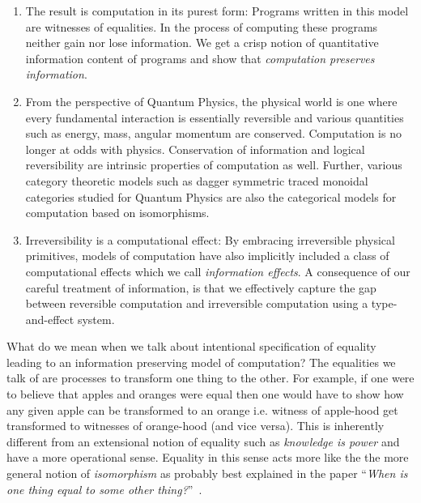 \documentclass{article}
\begin{document}
\begin{enumerate}

\item The result is computation in its purest form: Programs written
  in this model are witnesses of equalities. In the process of
  computing these programs neither gain nor lose information. We get a
  crisp notion of quantitative information content of programs and
  show that \emph{computation preserves information}.

\item From the perspective of Quantum Physics, the physical world is
  one where every fundamental interaction is essentially reversible
  and various quantities such as energy, mass, angular momentum are
  conserved. Computation is no longer at odds with
  physics. Conservation of information and logical reversibility are
  intrinsic properties of computation as well. Further, various
  category theoretic models such as dagger symmetric traced monoidal
  categories studied for Quantum Physics are also the categorical
  models for computation based on isomorphisms.

\item Irreversibility is a computational effect: By embracing
  irreversible physical primitives, models of computation have also
  implicitly included a class of computational effects which we call
  \emph{information effects}. A consequence of our careful treatment
  of information, is that we effectively capture the gap between
  reversible computation and irreversible computation using a
  type-and-effect system.

\end{enumerate}

What do we mean when we talk about intentional specification of
equality leading to an information preserving model of computation?
The equalities we talk of are processes to transform one thing to the
other. For example, if one were to believe that apples and oranges
were equal then one would have to show how any given apple can be
transformed to an orange i.e. witness of apple-hood get transformed to
witnesses of orange-hood (and vice versa). This is inherently
different from an extensional notion of equality such as
\emph{knowledge is power} and have a more operational sense. Equality
in this sense acts more like the the more general notion of
\emph{isomorphism} as probably best explained in the paper
``\emph{When is one thing equal to some other
  thing?}''~\cite{mazur2008one}.
\end{document}
